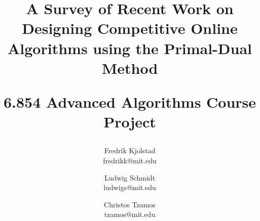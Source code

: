 \title{A Survey of Recent Work on Designing Competitive Online Algorithms using the Primal-Dual Method \\ \begin{large}6.854 Advanced Algorithms Course Project\end{large}}

\author{Fredrik Kjolstad \\ fredrikk@mit.edu \and Ludwig Schmidt \\ ludwigs@mit.edu \and Christos Tzamos \\ tzamos@mit.edu}
\date{}

\documentclass[10pt, twocolumn]{article}

\usepackage{amsmath}
\usepackage{amsthm}
\usepackage{url}
\usepackage{relsize}
\usepackage{xspace}
\usepackage{subfigure}
\usepackage{graphicx,color}
\usepackage[noend]{algorithmic}
\usepackage{algorithm}
\usepackage{paralist}
\renewcommand{\algorithmicrequire}{\textbf{Input:}}
\renewcommand{\algorithmicensure}{\textbf{Output:}}


\usepackage{fullpage}

\newcommand{\fred}[1]{%
	\textcolor{red}{[#1]}
}
\newcommand{\christos}[1]{%
	\textcolor{red}{[#1]}
}
\newcommand{\ludwig}[1]{%
	\textcolor{red}{[#1]}
}

\newtheorem{theorem}{Theorem}[section]
\newtheorem{lemma}[theorem]{Lemma}


\maketitle

\begin{abstract}
Online algorithms have become increasingly popular in the last few decades.
One important reason is that they capture the uncertainty we face in many important domains, ranging from computational finance to internet security and catastrophe management.
The primal-dual method is an approach that has been gaining popularity as a technique to arrive at approximations for NP-hard problems.
More recently it has also been applied as a general framework to solve many online problems.
In 2009, Buchbinder and Naor published a survey of applications of the primal-dual method to online algorithms.
Since then new complex online problems have been tackled using this technique, such as the online node-weighted steiner tree problem, the k-server problem and online job-migration.
We present a survey of recent applications of the primal-dual method to online problems.
\end{abstract}

